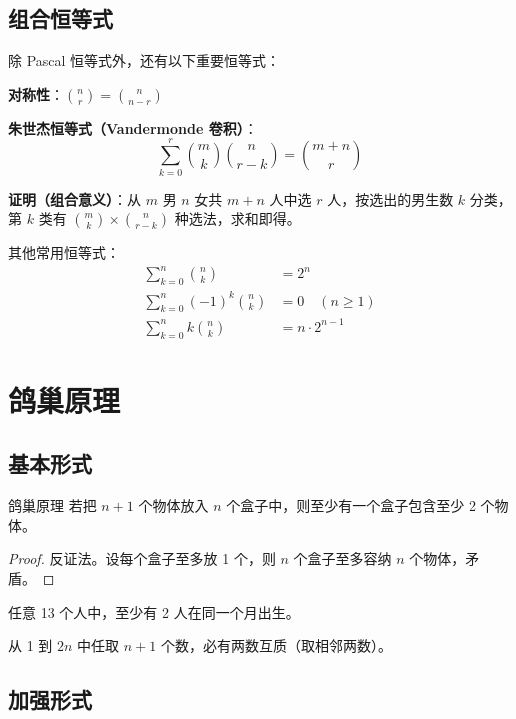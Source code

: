 \subsection{组合恒等式}

除 Pascal 恒等式外，还有以下重要恒等式：

\textbf{对称性}：$\displaystyle \binom{n}{r} = \binom{n}{n-r}$

\textbf{朱世杰恒等式（Vandermonde 卷积）}：
\[
\sum_{k=0}^{r} \binom{m}{k} \binom{n}{r-k} = \binom{m+n}{r}
\]

\textbf{证明（组合意义）}：从 $m$ 男 $n$ 女共 $m+n$ 人中选 $r$ 人，按选出的男生数 $k$ 分类，第 $k$ 类有 $\binom{m}{k} \times \binom{n}{r-k}$ 种选法，求和即得。

其他常用恒等式：
\begin{align}
\sum_{k=0}^{n} \binom{n}{k} &= 2^n \label{eq:sum-comb} \\
\sum_{k=0}^{n} (-1)^k \binom{n}{k} &= 0 \quad (n \geq 1) \label{eq:sum-comb-alt} \\
\sum_{k=0}^{n} k \binom{n}{k} &= n \cdot 2^{n-1} \label{eq:sum-k-comb}
\end{align}

\section{鸽巢原理}

\subsection{基本形式}

\begin{myTheorem}{鸽巢原理}
若把 $n+1$ 个物体放入 $n$ 个盒子中，则至少有一个盒子包含至少 2 个物体。
\end{myTheorem}

\begin{proof}
反证法。设每个盒子至多放 1 个，则 $n$ 个盒子至多容纳 $n$ 个物体，矛盾。
\end{proof}

\begin{example}
任意 13 个人中，至少有 2 人在同一个月出生。
\end{example}

\begin{example}
从 1 到 $2n$ 中任取 $n+1$ 个数，必有两数互质（取相邻两数）。
\end{example}

\subsection{加强形式}

